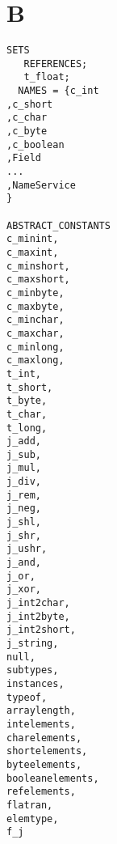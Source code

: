 \section{B}
\begin{verbatim}
SETS
   REFERENCES;
   t_float;
  NAMES = {c_int
,c_short
,c_char
,c_byte
,c_boolean
,Field
...
,NameService
}

ABSTRACT_CONSTANTS
c_minint,
c_maxint,
c_minshort,
c_maxshort,
c_minbyte,
c_maxbyte,
c_minchar,
c_maxchar,
c_minlong,
c_maxlong,
t_int,
t_short,
t_byte,
t_char,
t_long,
j_add,
j_sub,
j_mul,
j_div,
j_rem,
j_neg,
j_shl,
j_shr,
j_ushr,
j_and,
j_or,
j_xor,
j_int2char,
j_int2byte,
j_int2short,
j_string,
null,
subtypes,
instances,
typeof,
arraylength,
intelements,
charelements,
shortelements,
byteelements,
booleanelements,
refelements,
flatran,
elemtype,
f_j


\end{verbatim}
